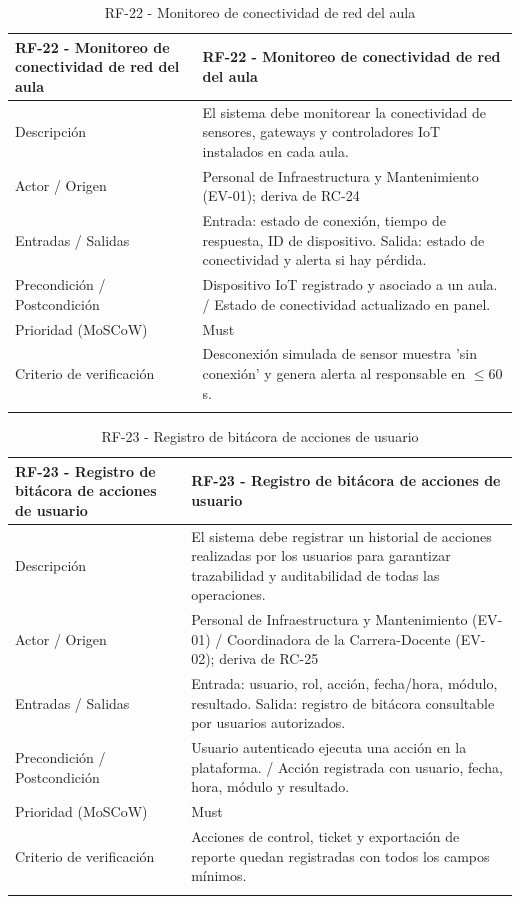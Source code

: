 \begingroup
\small
\begin{longtable}{|p{7.8cm}|p{7.8cm}|}
\hline
RF-22 - Monitoreo de conectividad de red del aula & RF-22 - Monitoreo de conectividad de red del aula \\ \hline
Descripción & El sistema debe monitorear la conectividad de sensores, gateways y controladores IoT instalados en cada aula. \\ \hline
Actor / Origen & Personal de Infraestructura y Mantenimiento (EV-01); deriva de RC-24 \\ \hline
Entradas / Salidas & Entrada: estado de conexión, tiempo de respuesta, ID de dispositivo. Salida: estado de conectividad y alerta si hay pérdida. \\ \hline
Precondición / Postcondición & Dispositivo IoT registrado y asociado a un aula. / Estado de conectividad actualizado en panel. \\ \hline
Prioridad (MoSCoW) & Must \\ \hline
Criterio de verificación & Desconexión simulada de sensor muestra 'sin conexión' y genera alerta al responsable en $\leq$60 s. \\ \hline
\caption{RF-22 - Monitoreo de conectividad de red del aula}
\end{longtable}
\endgroup

\begingroup
\small
\begin{longtable}{|p{7.8cm}|p{7.8cm}|}
\hline
RF-23 - Registro de bitácora de acciones de usuario & RF-23 - Registro de bitácora de acciones de usuario \\ \hline
Descripción & El sistema debe registrar un historial de acciones realizadas por los usuarios para garantizar trazabilidad y auditabilidad de todas las operaciones. \\ \hline
Actor / Origen & Personal de Infraestructura y Mantenimiento (EV-01) / Coordinadora de la Carrera-Docente (EV-02); deriva de RC-25 \\ \hline
Entradas / Salidas & Entrada: usuario, rol, acción, fecha/hora, módulo, resultado. Salida: registro de bitácora consultable por usuarios autorizados. \\ \hline
Precondición / Postcondición & Usuario autenticado ejecuta una acción en la plataforma. / Acción registrada con usuario, fecha, hora, módulo y resultado. \\ \hline
Prioridad (MoSCoW) & Must \\ \hline
Criterio de verificación & Acciones de control, ticket y exportación de reporte quedan registradas con todos los campos mínimos. \\ \hline
\caption{RF-23 - Registro de bitácora de acciones de usuario}
\end{longtable}
\endgroup


